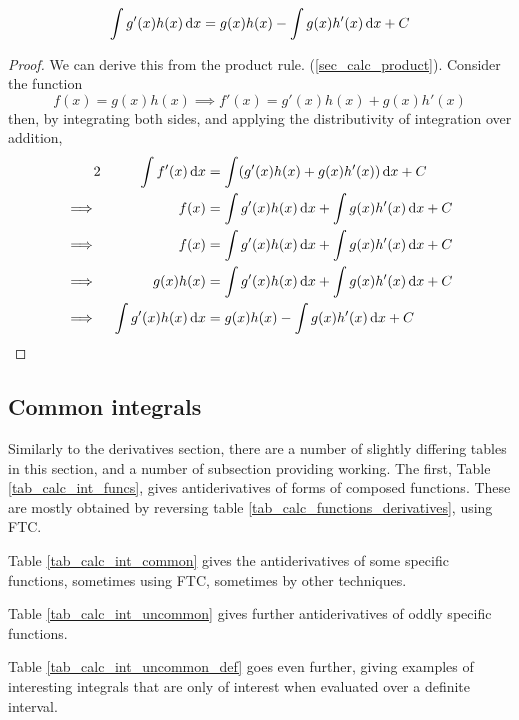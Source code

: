 \begin{theorem}
 \begin{equation*}
  \integ{g'(x)h(x)}{x} = g(x)h(x) - \integ{g(x)h'(x)}{x} + C
 \end{equation*}
\end{theorem}
\begin{proof}
 We can derive this from the product rule.
 (\ref{sec_calc_product}).  Consider the function
 \begin{equation*}
  f(x) = g(x) h(x) \implies f'(x) = g'(x) h(x) + g(x) h'(x)
 \end{equation*}
 then, by integrating both sides, and applying the distributivity of
 integration over addition,
 \begin{alignat*} 2
  && \integ{f'(x)}{x} &= \integ{(g'(x)h(x) + g(x)h'(x))}{x} + C \\
  \implies{}&& f(x) &= \integ{g'(x)h(x)}{x} + \integ{g(x)h'(x)}{x} + C \\
  \implies{}&& f(x) &= \integ{g'(x)h(x)}{x} + \integ{g(x)h'(x)}{x} + C \\
  \implies{}&& g(x)h(x)
      &= \integ{g'(x)h(x)}{x} + \integ{g(x)h'(x)}{x} + C \\
  \implies{}&& \integ{g'(x)h(x)}{x}
      &= g(x)h(x) - \integ{g(x)h'(x)}{x} + C \qedhere \\
 \end{alignat*}
\end{proof}

\subsection{Common integrals}

Similarly to the derivatives section, there are a number of slightly differing
tables in this section, and a number of subsection providing working. The first,
Table \ref{tab_calc_int_funcs}, gives antiderivatives of forms of composed
functions.  These are mostly obtained by reversing table
\ref{tab_calc_functions_derivatives}, using FTC.

Table \ref{tab_calc_int_common} gives the antiderivatives of some specific
functions, sometimes using FTC, sometimes by other techniques.

Table \ref{tab_calc_int_uncommon} gives further antiderivatives of oddly
specific functions.

Table \ref{tab_calc_int_uncommon_def} goes even further, giving examples of
interesting integrals that are only of interest when evaluated over a definite
interval.

